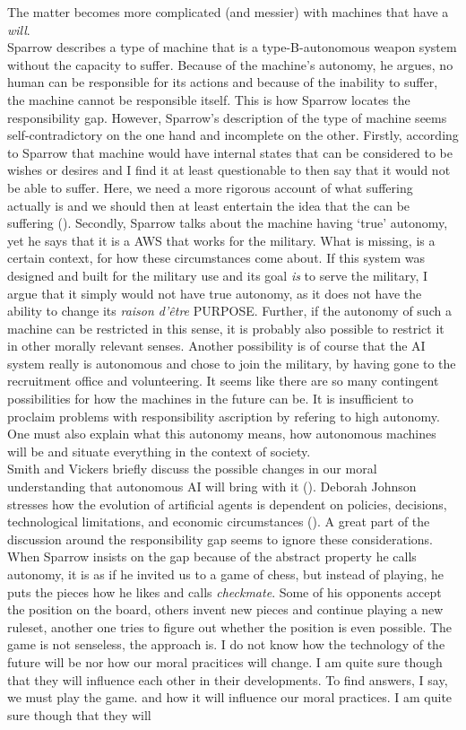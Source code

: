 \documentclass{article}
\begin{document}
The matter becomes more complicated (and messier) with machines that have a
\textit{will}.\\
Sparrow describes a type of machine that is a type-B-autonomous weapon system
without the capacity to suffer. Because of the machine's autonomy, he argues, no
human can be responsible for its actions and because of the inability to suffer,
the machine cannot be responsible itself. This is how Sparrow locates the
responsibility gap. However, Sparrow's description of the type of machine seems
self-contradictory on the one hand and incomplete on the other. Firstly, according to
Sparrow that machine would have internal states that can be considered to be
wishes or desires and I find it at least questionable to then say that it would
not be able to suffer. Here, we need a more rigorous account of what suffering
actually is and we should then at least entertain the idea that the
 can be suffering (\cite[p.
71]{sparrow2007killer}). Secondly, Sparrow talks about the machine having `true'
autonomy, yet he says that it is a AWS that works for the military. What is
missing, is a certain context, for how these circumstances come about. If this
system was designed and built for the military use and its goal \textit{is} to
serve the military, I argue that it simply would not have true autonomy, as it does not
have the ability to change its \textit{raison d'être} PURPOSE. Further, if the
autonomy of such a machine can be restricted in this sense, it is probably also
possible to restrict it in other morally relevant senses. Another possibility is
of course that the AI system really is autonomous and chose to join the
military, by having gone to the recruitment office and volunteering. It seems
like there are so many contingent possibilities for how the machines in the
future can be. It is insufficient to proclaim problems with responsibility
ascription by refering to high autonomy. One must also explain what this
autonomy means, how autonomous machines will be and situate everything in the
context of society.\\
Smith and Vickers briefly discuss the possible changes in our moral
understanding that autonomous AI will bring with it (\cite[p.
8]{SmithVickers2021}). Deborah Johnson stresses how the evolution of artificial
agents is dependent on policies, decisions, technological limitations, and
economic circumstances (\cite{johnson2015technology}). A great part of the
discussion around the responsibility gap seems to ignore these considerations.
When Sparrow insists on the gap because of the abstract property he calls
autonomy, it is as if he invited us to a game of chess, but instead of playing,
he puts the pieces how he likes and calls \textit{checkmate}. Some of his
opponents accept the position on the board, others invent new pieces and
continue playing a new ruleset, another one tries to figure out whether the
position is even possible. The game is not senseless, the approach is. I do not
know how the technology of the future will be nor how our moral pracitices will
change. I am quite sure though that they will influence each other in their
developments. To find answers, I say, we must play the game.
\newpage
and how it will influence our
moral practices. I am quite sure though that they will
\end{document}
